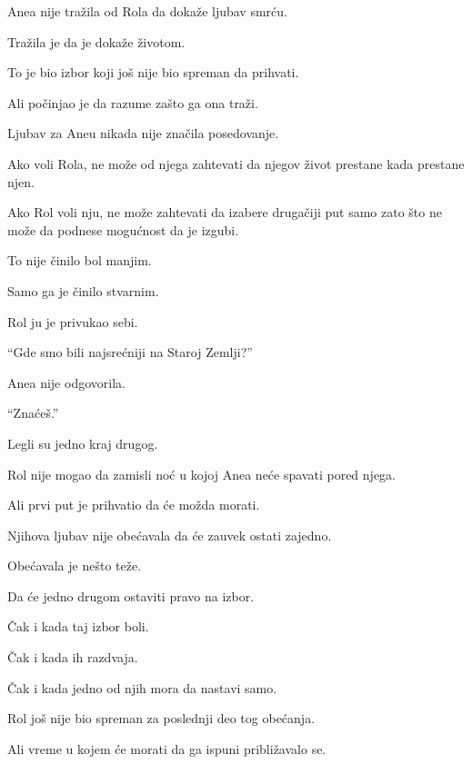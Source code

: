 \bigskip

Anea nije tražila od Rola da dokaže ljubav smrću.

\bigskip

Tražila je da je dokaže životom.

\bigskip

To je bio izbor koji još nije bio spreman da prihvati.

\bigskip

Ali počinjao je da razume zašto ga ona traži.

\bigskip

Ljubav za Aneu nikada nije značila posedovanje.

\bigskip

Ako voli Rola, ne može od njega zahtevati da njegov život prestane kada prestane njen.

\bigskip

Ako Rol voli nju, ne može zahtevati da izabere drugačiji put samo zato što ne može da podnese mogućnost da je izgubi.

\bigskip

To nije činilo bol manjim.

\bigskip

Samo ga je činilo stvarnim.

\bigskip

Rol ju je privukao sebi.

\bigskip

``Gde smo bili najsrećniji na Staroj Zemlji?''

\bigskip

Anea nije odgovorila.

``Znaćeš.''

\bigskip

Legli su jedno kraj drugog.

\bigskip

Rol nije mogao da zamisli noć u kojoj Anea neće spavati pored njega.

\bigskip

Ali prvi put je prihvatio da će možda morati.

\bigskip

Njihova ljubav nije obećavala da će zauvek ostati zajedno.

\bigskip

Obećavala je nešto teže.

\bigskip

Da će jedno drugom ostaviti pravo na izbor.

\bigskip

Čak i kada taj izbor boli.

\bigskip

Čak i kada ih razdvaja.

\bigskip

Čak i kada jedno od njih mora da nastavi samo.

\bigskip

Rol još nije bio spreman za poslednji deo tog obećanja.

\bigskip

Ali vreme u kojem će morati da ga ispuni približavalo se.